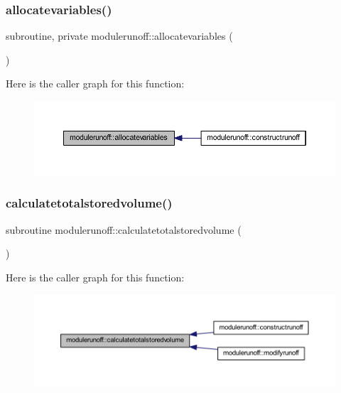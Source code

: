 \subsubsection{\texorpdfstring{allocatevariables()}{allocatevariables()}}
{\footnotesize\ttfamily subroutine, private modulerunoff\+::allocatevariables (\begin{DoxyParamCaption}{ }\end{DoxyParamCaption})\hspace{0.3cm}{\ttfamily [private]}}

Here is the caller graph for this function\+:\nopagebreak
\begin{figure}[H]
\begin{center}
\leavevmode
\includegraphics[width=350pt]{namespacemodulerunoff_a3a007b7a4dcf19d2d269172e36d996de_icgraph}
\end{center}
\end{figure}
\mbox{\label{namespacemodulerunoff_a341a4c8ef2509bc0f144f8afd17ece22}} 
\subsubsection{\texorpdfstring{calculatetotalstoredvolume()}{calculatetotalstoredvolume()}}
{\footnotesize\ttfamily subroutine modulerunoff\+::calculatetotalstoredvolume (\begin{DoxyParamCaption}{ }\end{DoxyParamCaption})\hspace{0.3cm}{\ttfamily [private]}}

Here is the caller graph for this function\+:\nopagebreak
\begin{figure}[H]
\begin{center}
\leavevmode
\includegraphics[width=350pt]{namespacemodulerunoff_a341a4c8ef2509bc0f144f8afd17ece22_icgraph}
\end{center}
\end{figure}
\mbox{\label{namespacemodulerunoff_a56a143bff3b48f116a7cef30352f962e}} 
